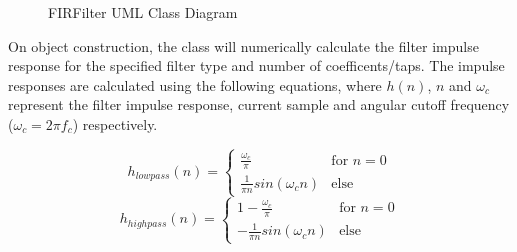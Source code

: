 \documentclass[main.tex]{subfiles}
\begin{document}
\begin{figure}[H]
    \centering
    \caption{FIRFilter UML Class Diagram}
    \label{fig:fir-uml}
\end{figure}

\medskip
On object construction, the class will numerically calculate the filter impulse response for the specified filter type and number of coefficents/taps. 
The impulse responses are calculated using the following equations\cite{DSP-berndporr}, where $h(n)$, $n$ and $\omega _c$ represent the filter impulse response, current sample and angular cutoff frequency ($\omega _c = 2\pi f_c$) respectively.

\begin{equation}
    h_{lowpass}(n) =
    \begin{cases}
        \frac{\omega _c}{\pi}     &\text{for \(n=0\)}  \\
        \frac{1}{\pi n}sin(\omega _cn)    &\text{else}
    \end{cases}
\end{equation}
\begin{equation}
    h_{highpass}(n) =
    \begin{cases}
        1-\frac{\omega _c}{\pi}     &\text{for \(n=0\)}  \\
        -\frac{1}{\pi n}sin(\omega _cn)    &\text{else}
    \end{cases}
\end{equation}
\end{document}
